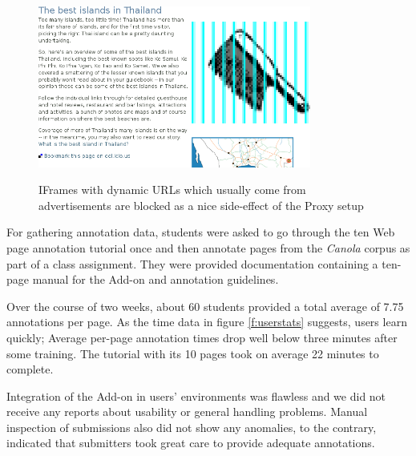 \begin{figure}
	{\includegraphics[width=0.8\textwidth]{add}}
\caption{\label{f:iframes}IFrames with dynamic URLs which usually come from advertisements are blocked as a nice side-effect of the Proxy setup}
\end{figure}

For gathering annotation data, students were asked to go through the ten Web page annotation tutorial once and then annotate pages from the \textit{Canola} corpus as part of a class assignment.
They were provided documentation containing a ten-page manual for the Add-on and annotation guidelines.

Over the course of two weeks, about 60 students provided a total average of 7.75 annotations per page.
As the time data in figure \ref{f:userstats} suggests, users learn quickly; 
Average per-page annotation times drop well below three minutes after some training.
The tutorial with its 10 pages took on average 22 minutes to complete.

Integration of the Add-on in users' environments was flawless and we did not receive any reports about usability or general handling problems.
Manual inspection of submissions also did not show any anomalies, to the contrary, indicated that submitters took great care to provide adequate annotations.

